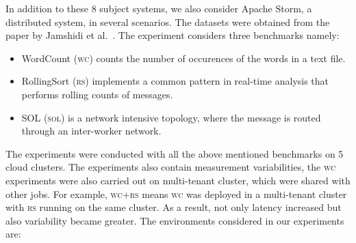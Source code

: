 In addition to these 8 subject systems, we also consider Apache Storm, a distributed system, in several scenarios. The datasets were obtained from the paper by Jamshidi et al.~\cite{jamshidi2016uncertainty}. The experiment considers three  benchmarks namely:
\begin{itemize}
    \item WordCount (\textsc{wc}) counts the number of occurences of the words in a text file. 
    \item RollingSort (\textsc{rs}) implements a common pattern in real-time analysis that performs rolling counts of messages. 
    \item SOL (\textsc{sol}) is a network intensive topology, where the message is routed through an inter-worker network.
\end{itemize}
The experiments were conducted with all the above mentioned benchmarks on 5 cloud clusters. The experiments also contain measurement variabilities, the \textsc{wc} experiments were also carried out on multi-tenant cluster, which were shared with other jobs. For example, \textsc{wc}+\textsc{rs} means \textsc{wc} was deployed in a multi-tenant cluster with \textsc{rs} running on the same cluster. As a result, not only latency increased but also variability became greater. The environments considered in our experiments are:
